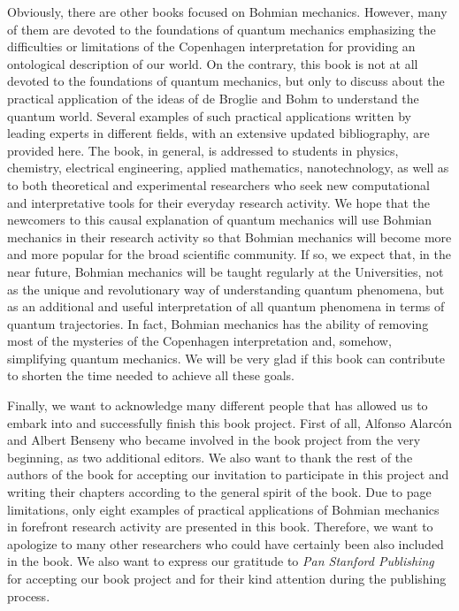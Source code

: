 \documentclass[onecolumn,nofootinbib, secnumarabic, amsmath, nobibnotes,12pt,aps,pra]{revtex4-1}
\begin{document}
Obviously, there are other books focused on Bohmian mechanics. However, many of them are devoted to the foundations of quantum mechanics emphasizing the difficulties or limitations of the Copenhagen interpretation for providing an ontological description of our world. On the contrary, this book is not at all devoted to the foundations of quantum mechanics, but only to discuss about the practical application of the ideas of de Broglie and Bohm to understand the quantum world. Several examples of such practical applications written by leading experts in different fields, with an extensive updated bibliography, are provided here.  The book, in general, is addressed to students in physics, chemistry, electrical engineering, applied mathematics, nanotechnology, as well as to both theoretical and experimental researchers who seek new computational and interpretative tools for their everyday research activity. We hope that the newcomers to this causal explanation of quantum mechanics will use Bohmian mechanics in their research activity so that Bohmian mechanics will become more and more popular for the broad scientific community. If so, we expect that, in the near future, Bohmian mechanics will be taught regularly at the Universities, not as the unique and revolutionary way of understanding quantum phenomena, but as an additional and useful interpretation of all quantum phenomena in terms of quantum trajectories. In fact, Bohmian mechanics has the ability of removing most of the mysteries of the Copenhagen interpretation and, somehow, simplifying quantum mechanics. We will be very glad if this book can contribute to shorten the time needed to achieve all these goals.

Finally, we want to acknowledge many different people that has allowed us to embark into and successfully finish this book project. First of all, Alfonso Alarc\'on and Albert Benseny who became involved in the book project from the very beginning, as two additional editors. We also want to thank the rest of the authors of the book for accepting our invitation to participate in this project and writing their chapters according to the general spirit of the book. Due to page limitations, only eight examples of practical applications of Bohmian mechanics in forefront research activity are presented in this book. Therefore, we want to apologize to many other researchers who could have certainly been also included in the book. We also want to express our gratitude to \emph{Pan Stanford Publishing} for accepting our book project and for their kind attention during the publishing process.
\end{document}
